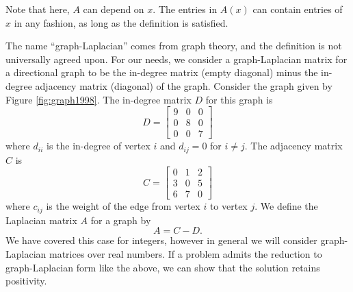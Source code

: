 Note that here, $A$ can depend on $x$. The entries in $A(x)$ can contain entries of $x$ in any fashion, as long as the definition is satisfied.

The name ``graph-Laplacian'' comes from graph theory, and the definition is not universally agreed upon.
For our needs, we consider a graph-Laplacian matrix for a directional graph to be the in-degree matrix (empty diagonal) minus the in-degree adjacency matrix (diagonal) of the graph.
Consider the graph given by Figure \ref{fig:graph1998}.
The in-degree matrix $D$ for this graph is
\begin{equation*}
    D = \begin{bmatrix}
        9 & 0 & 0 \\
        0 & 8 & 0 \\
        0 & 0 & 7
    \end{bmatrix}
\end{equation*}
where $d_{ii}$ is the in-degree of vertex $i$ and $d_{ij}=0$ for $i \neq j$. 
The adjacency matrix $C$ is
\begin{equation*}
    C = \begin{bmatrix}
        0 & 1 & 2 \\
        3 & 0 & 5 \\
        6 & 7 & 0
    \end{bmatrix}
\end{equation*}
where $c_{ij}$ is the weight of the edge from vertex $i$ to vertex $j$.
We define the Laplacian matrix $A$ for a graph by
\begin{equation}
    A = C - D.
\end{equation}
We have covered this case for integers, however in general we will consider graph-Laplacian matrices over real numbers.
If a problem admits the reduction to graph-Laplacian form like the above,
we can show that the solution retains positivity.

